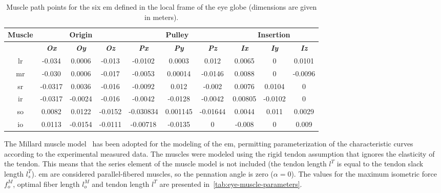 \documentclass[11pt,a4paper,draft=false]{report}
\begin{document}
\begin{table}[ht]
  \centering
  \caption{Muscle path points for the six \gls{em} defined in the local frame of
    the eye globe (dimensions are given in meters).}\label{tab:eye-muscle-path}
  \begin{tabular}{@{}cccccccccc@{}}
    \toprule
    \textbf{Muscle}
    & \multicolumn{3}{c}{\textbf{Origin}}
    & \multicolumn{3}{c}{\textbf{Pulley}}
    & \multicolumn{3}{c}{\textbf{Insertion}} \\
    \midrule
    & \textit{\textbf{Ox}} & \textit{\textbf{Oy}} & \textit{\textbf{Oz}}
    & \textit{\textbf{Px}} & \textit{\textbf{Py}} & \textit{\textbf{Pz}}
    & \textit{\textbf{Ix}} & \textit{\textbf{Iy}} & \textit{\textbf{Iz}} \\
    \midrule
    \gls{lr} & -0.034 & 0.0006 & -0.013 & -0.0102 & 0.0003 & 0.012 & 0.0065 & 0 & 0.0101 \\
    \gls{mr} & -0.030 & 0.0006 & -0.017 & -0.0053 & 0.00014 & -0.0146 & 0.0088 & 0 & -0.0096 \\
    \gls{sr} & -0.0317 & 0.0036 & -0.016 & -0.0092 & 0.012 & -0.002 & 0.0076 & 0.0104 & 0 \\
    \gls{ir} & -0.0317 & -0.0024 & -0.016 & -0.0042 & -0.0128 & -0.0042 & 0.00805 & -0.0102 & 0 \\
    \gls{so} & 0.0082 & 0.0122 & -0.0152 & -0.030834 & 0.001145 & -0.01644 & 0.0044 & 0.011 & 0.0029 \\
    \gls{io} & 0.0113 & -0.0154 & -0.0111 & -0.00718 & -0.0135 & 0 & -0.008 & 0 & 0.009 \\
    \bottomrule
  \end{tabular}
\end{table}

The Millard muscle model~\cite{Millard2013} has been adopted for the modeling of
the \gls{em}, permitting parameterization of the characteristic curves according
to the experimental measured data. The muscles were modeled using the rigid
tendon assumption that ignores the elasticity of the tendon. This means that the
series element of the muscle model is not included (the tendon length $l^T$ is
equal to the tendon slack length $l_s^T$). \gls{em} are considered
parallel-fibered muscles, so the pennation angle is zero ($\alpha = 0$). The
values for the maximum isometric force $f_o^M$, optimal fiber length $l_o^M$ and
tendon length $l^T$ are presented in~\autoref{tab:eye-muscle-parameters}.
\end{document}
